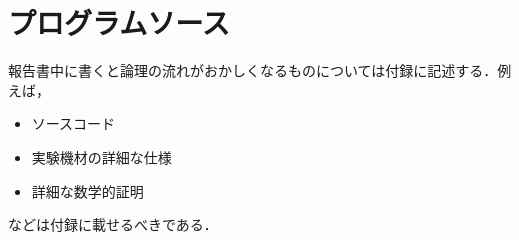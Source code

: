 ﻿%
\chapter{プログラムソース}

報告書中に書くと論理の流れがおかしくなるものについては付録に記述する．例えば，

\begin{itemize}
 \item ソースコード
 \item 実験機材の詳細な仕様
 \item 詳細な数学的証明 
\end{itemize}

などは付録に載せるべきである．